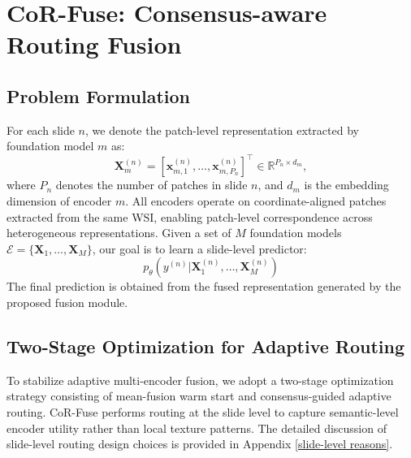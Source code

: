 \section{CoR-Fuse: Consensus-aware Routing Fusion}
\subsection{Problem Formulation}
For each slide \(n\), we denote the patch-level representation extracted by foundation model \(m\) as:
\begin{equation}
\mathbf{X}_m^{(n)}
=
[
\mathbf{x}_{m,1}^{(n)},
\ldots,
\mathbf{x}_{m,P_n}^{(n)}
]^\top
\in
\mathbb{R}^{P_n\times d_m},
\end{equation}
where \(P_n\) denotes the number of patches in slide \(n\), and \(d_m\) is the embedding dimension of encoder \(m\).
All encoders operate on coordinate-aligned patches extracted from the same WSI, enabling patch-level correspondence across heterogeneous representations.
Given a set of \(M\) foundation models \(\mathcal{E}=\{\mathbf{X}_1,\ldots,\mathbf{X}_M\}\), our goal is to learn a slide-level predictor:
\begin{equation}
p_\theta
(y^{(n)}
|
\mathbf{X}_1^{(n)},\ldots,\mathbf{X}_M^{(n)})
\end{equation}
The final prediction is obtained from the fused representation generated by the proposed fusion module.
\subsection{Two-Stage Optimization for Adaptive Routing}
To stabilize adaptive multi-encoder fusion, we adopt a two-stage optimization strategy consisting of mean-fusion warm start and consensus-guided adaptive routing.
CoR-Fuse performs routing at the slide level to capture semantic-level encoder utility rather than local texture patterns. 
The detailed discussion of slide-level routing design choices is provided in Appendix \ref{slide-level reasons}.
